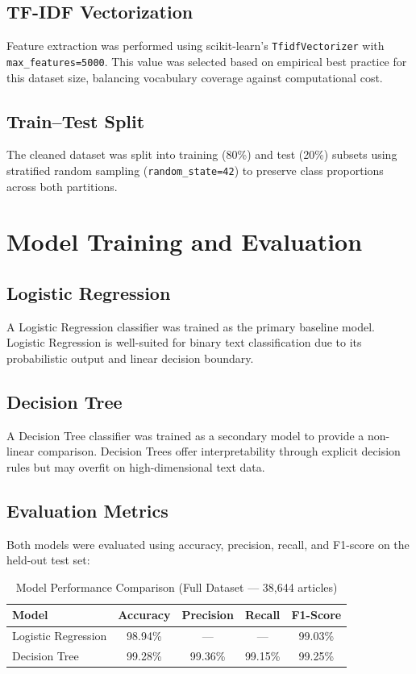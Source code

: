\documentclass[12pt, a4paper]{article}
\begin{document}
\subsection{TF-IDF Vectorization}
Feature extraction was performed using scikit-learn's \texttt{TfidfVectorizer} with \texttt{max\_features=5000}. This value was selected based on empirical best practice for this dataset size, balancing vocabulary coverage against computational cost.

\subsection{Train--Test Split}
The cleaned dataset was split into training (80\%) and test (20\%) subsets using stratified random sampling (\texttt{random\_state=42}) to preserve class proportions across both partitions.

\section{Model Training and Evaluation}

\subsection{Logistic Regression}
A Logistic Regression classifier was trained as the primary baseline model. Logistic Regression is well-suited for binary text classification due to its probabilistic output and linear decision boundary.

\subsection{Decision Tree}
A Decision Tree classifier was trained as a secondary model to provide a non-linear comparison. Decision Trees offer interpretability through explicit decision rules but may overfit on high-dimensional text data.

\subsection{Evaluation Metrics}
Both models were evaluated using accuracy, precision, recall, and F1-score on the held-out test set:

\begin{table}[H]
\centering
\caption{Model Performance Comparison (Full Dataset — 38,644 articles)}
\begin{tabular}{@{}lcccc@{}}
\toprule
\textbf{Model}          & \textbf{Accuracy} & \textbf{Precision} & \textbf{Recall} & \textbf{F1-Score} \\
\midrule
Logistic Regression      & 98.94\%           & ---                & ---             & 99.03\%           \\
Decision Tree            & 99.28\%           & 99.36\%            & 99.15\%         & 99.25\%           \\
\bottomrule
\end{tabular}
\end{table}
\end{document}
